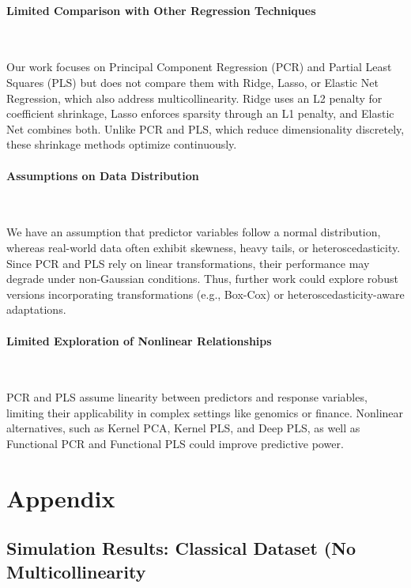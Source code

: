 \documentclass[11pt,twoside,a4paper]{article}
\begin{document}
\paragraph{Limited Comparison with Other Regression Techniques} \ \

Our work focuses on Principal Component Regression (PCR) and Partial Least Squares (PLS) but does not compare them with Ridge, Lasso, or Elastic Net Regression, which also address multicollinearity. Ridge uses an L2 penalty for coefficient shrinkage, Lasso enforces sparsity through an L1 penalty, and Elastic Net combines both. Unlike PCR and PLS, which reduce dimensionality discretely, these shrinkage methods optimize continuously.  

\paragraph{Assumptions on Data Distribution} \ \

We have an assumption that predictor variables follow a normal distribution, whereas real-world data often exhibit skewness, heavy tails, or heteroscedasticity. Since PCR and PLS rely on linear transformations, their performance may degrade under non-Gaussian conditions. Thus, further work could explore robust versions incorporating transformations (e.g., Box-Cox) or heteroscedasticity-aware adaptations.  

\paragraph{Limited Exploration of Nonlinear Relationships} \ \

PCR and PLS assume linearity between predictors and response variables, limiting their applicability in complex settings like genomics or finance. Nonlinear alternatives, such as Kernel PCA, Kernel PLS, and Deep PLS, as well as Functional PCR and Functional PLS could improve predictive power.

\newpage

\section{Appendix}
\subsection{Simulation Results: Classical Dataset (No Multicollinearity}
\end{document}
